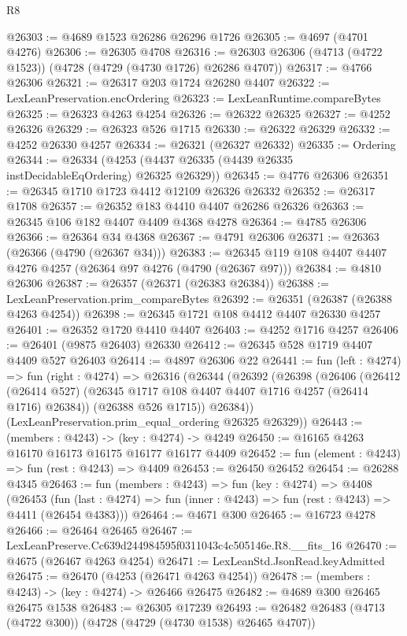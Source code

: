 \begin{lexlean}{R8}
\begin{coremodule}
@26303 := @4689 @1523 @26286 @26296 @1726
@26305 := @4697 (@4701 @4276)
@26306 := @26305 @4708
@26316 := @26303 @26306 (@4713 (@4722 @1523)) (@4728 (@4729 (@4730 @1726) @26286 @4707))
@26317 := @4766 @26306
@26321 := @26317 @203 @1724 @26280 @4407
@26322 := LexLeanPreservation.encOrdering
@26323 := LexLeanRuntime.compareBytes
@26325 := @26323 @4263 @4254
@26326 := @26322 @26325
@26327 := @4252 @26326
@26329 := @26323 @526 @1715
@26330 := @26322 @26329
@26332 := @4252 @26330 @4257
@26334 := @26321 (@26327 @26332)
@26335 := Ordering
@26344 := @26334 (@4253 (@4437 @26335 (@4439 @26335 instDecidableEqOrdering) @26325 @26329))
@26345 := @4776 @26306
@26351 := @26345 @1710 @1723 @4412 @12109 @26326 @26332
@26352 := @26317 @1708
@26357 := @26352 @183 @4410 @4407 @26286 @26326
@26363 := @26345 @106 @182 @4407 @4409 @4368 @4278
@26364 := @4785 @26306
@26366 := @26364 @34 @4368
@26367 := @4791 @26306
@26371 := @26363 (@26366 (@4790 (@26367 @34)))
@26383 := @26345 @119 @108 @4407 @4407 @4276 @4257 (@26364 @97 @4276 (@4790 (@26367 @97)))
@26384 := @4810 @26306
@26387 := @26357 (@26371 (@26383 @26384))
@26388 := LexLeanPreservation.prim_compareBytes
@26392 := @26351 (@26387 (@26388 @4263 @4254))
@26398 := @26345 @1721 @108 @4412 @4407 @26330 @4257
@26401 := @26352 @1720 @4410 @4407
@26403 := @4252 @1716 @4257
@26406 := @26401 (@9875 @26403) @26330
@26412 := @26345 @528 @1719 @4407 @4409 @527 @26403
@26414 := @4897 @26306 @22
@26441 := fun (left : @4274) =>
  fun (right : @4274) =>
  @26316
    (@26344
      (@26392
        (@26398
          (@26406
            (@26412 (@26414 @527) (@26345 @1717 @108 @4407 @4407 @1716 @4257 (@26414 @1716) @26384))
            (@26388 @526 @1715))
          @26384))
      (LexLeanPreservation.prim_equal_ordering @26325 @26329))
@26443 := (members : @4243) -> (key : @4274) -> @4249
@26450 := @16165 @4263 @16170 @16173 @16175 @16177 @16177 @4409
@26452 := fun (element : @4243) => fun (rest : @4243) => @4409
@26453 := @26450 @26452
@26454 := @26288 @4345
@26463 := fun (members : @4243) =>
  fun (key : @4274) =>
  @4408
    (@26453
      (fun (last : @4274) => fun (inner : @4243) => fun (rest : @4243) => @4411 (@26454 @4383)))
@26464 := @4671 @300
@26465 := @16723 @4278
@26466 := @26464 @26465
@26467 := LexLeanPreserve.Cc639d244984595f0311043c4c505146e.R8.__fits_16
@26470 := @4675 (@26467 @4263 @4254)
@26471 := LexLeanStd.JsonRead.keyAdmitted
@26475 := @26470 (@4253 (@26471 @4263 @4254))
@26478 := (members : @4243) -> (key : @4274) -> @26466 @26475
@26482 := @4689 @300 @26465 @26475 @1538
@26483 := @26305 @17239
@26493 := @26482 @26483 (@4713 (@4722 @300)) (@4728 (@4729 (@4730 @1538) @26465 @4707))

\end{coremodule}
\end{lexlean}
